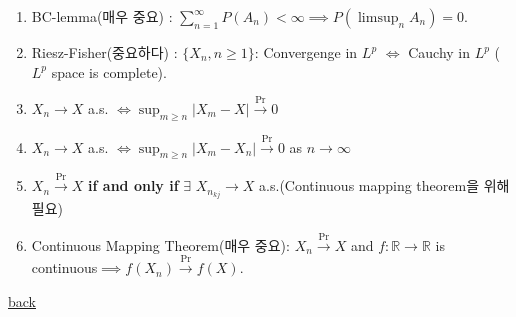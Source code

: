 \documentclass[]{article}
\begin{document}
\begin{enumerate}
\def\labelenumi{\arabic{enumi}.}
\item
  BC-lemma(매우 중요) :
  \(\sum_{n=1}^{\infty}P(A_n)<\infty\implies P(\limsup_nA_n)=0\).
\item
  Riesz-Fisher(중요하다) : \(\{X_n,n\ge 1\}\): Convergenge in \(L^p\)
  \(\iff\) Cauchy in \(L^p\) (\(L^p\) space is complete).
\item
  \(X_n\rightarrow X\) a.s.
  \(\iff \sup_{m\ge n}|X_m-X|\stackrel{\text{Pr}}\rightarrow 0\)
\item
  \(X_n\rightarrow X\) a.s.
  \(\iff \sup_{m\ge n}|X_m-X_n|\stackrel{\text{Pr}}\rightarrow 0\) as
  \(n\rightarrow \infty\)
\item
  \(X_n\stackrel{\text{Pr}}\rightarrow X\) \textbf{if and only if}
  \(\exists\) \(X_{n_{kj}}\rightarrow X\) a.s.(Continuous mapping
  theorem을 위해 필요)
\item
  Continuous Mapping Theorem(매우 중요):
  \(X_n\stackrel{\text{Pr}}\rightarrow X\) and
  \(f:\mathbb{R}\rightarrow\mathbb{R}\) is
  continuous\(\implies f(X_n)\stackrel{\text{Pr}}\rightarrow f(X)\).
\end{enumerate}

\href{../probability1.html}{back}
\end{document}
